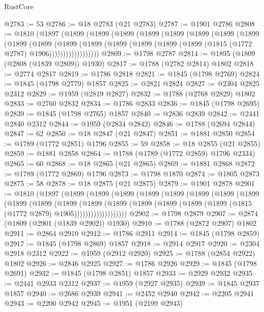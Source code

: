 \begin{lexlean}{RustCore}
\begin{coremodule}
@2783 := 53
@2786 := @18 @2783 (@21 @2783)
@2787 := @1901 @2786
@2808 := @1810
    (@1897
      (@1899
        (@1899
          (@1899
            (@1899
              (@1899
                (@1899
                  (@1899
                    (@1899
                      (@1899
                        (@1899
                          (@1899
                            (@1899
                              (@1899
                                (@1899 (@1899 (@1899 (@1815 (@1772 @2787) @1906))))))))))))))))))
@2809 := @1798 @2787
@2814 := @1895 (@1809 (@2808 (@1839 @2809)) @1930)
@2817 := @1788 (@2782 @2814) @1802
@2818 := @2774 @2817
@2819 := @1786 @2818
@2821 := @1845 (@1798 @2769)
@2824 := @1845 (@1798 @2779) @1857
@2825 := @2821 @2824
@2827 := @2304 @2825 @2312
@2829 := @1959 (@2819 @2827)
@2832 := @1788 (@2768 @2829) @1802
@2833 := @2760 @2832
@2834 := @1786 @2833
@2836 := @1845 (@1798 @2695)
@2839 := @1845 (@1798 @2765) @1857
@2840 := @2836 @2839
@2842 := @2441 @2840 @2312
@2844 := @1959 (@2834 @2842)
@2846 := @1788 (@2694 @2844)
@2847 := 62
@2850 := @18 @2847 (@21 @2847)
@2851 := @1881 @2850
@2854 := @1789 (@1772 @2851) @1796
@2855 := 59
@2858 := @18 @2855 (@21 @2855)
@2859 := @1881 @2858
@2864 := @1788 (@1789 (@1772 @2859) @1796 @2334)
@2865 := 60
@2868 := @18 @2865 (@21 @2865)
@2869 := @1881 @2868
@2872 := @1789 (@1772 @2869) @1796
@2873 := @1798 @1870
@2874 := @1805 @2873
@2875 := 58
@2878 := @18 @2875 (@21 @2875)
@2879 := @1901 @2878
@2901 := @1810
    (@1897
      (@1899
        (@1899
          (@1899
            (@1899
              (@1899
                (@1899
                  (@1899
                    (@1899
                      (@1899
                        (@1899
                          (@1899
                            (@1899
                              (@1899
                                (@1899
                                  (@1899 (@1899 (@1899 (@1815 (@1772 @2879) @1905)))))))))))))))))))
@2902 := @1798 @2879
@2907 := @2874 (@1809 (@2901 (@1839 @2902)) @1930)
@2910 := @1788 (@2872 @2907) @1802
@2911 := @2864 @2910
@2912 := @1786 @2911
@2914 := @1845 (@1798 @2859)
@2917 := @1845 (@1798 @2869) @1857
@2918 := @2914 @2917
@2920 := @2304 @2918 @2312
@2922 := @1959 (@2912 @2920)
@2925 := @1788 (@2854 @2922) @1802
@2926 := @2846 @2925
@2927 := @1786 @2926
@2929 := @1845 (@1798 @2691)
@2932 := @1845 (@1798 @2851) @1857
@2933 := @2929 @2932
@2935 := @2441 @2933 @2312
@2937 := @1959 (@2927 @2935)
@2939 := @1845 @2937 @1857
@2940 := @2686 @2939
@2941 := @2452 @2940
@2942 := @2205 @2941
@2943 := @2200 @2942
@2945 := @1951 (@2199 @2943)

\end{coremodule}
\end{lexlean}
